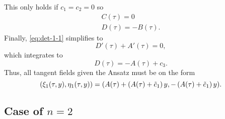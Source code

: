 This only holds if \(c_1 = c_2 = 0\) so
\begin{gather}
  C(\tau) = 0 \\
  D(\tau) = - B(\tau).
\end{gather}
Finally, \cref{eq:det-1-1} simplifies to
\begin{equation}
  D'(\tau) + A'(\tau) = 0,
\end{equation}
which integrates to
\begin{equation}
  D(\tau) = - A(\tau) + c_3.
\end{equation}
Thus, all tangent fields given the Ansatz must be on the form
\begin{equation} \label{eq:hill-tangent-field-1}
  \pqty{\xi_1(\tau,y),\eta_1(\tau,y)} = 
  \pqty{A(\tau) + \left( A(\tau) + \tilde{c}_1 \right) y, - \left( A(\tau) + \tilde{c}_1 \right) y}.
\end{equation}

\subsection{Case of \texorpdfstring{\(n=2\)}{n is 2}}

